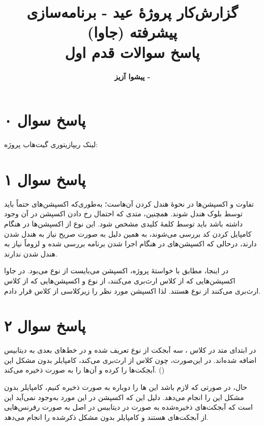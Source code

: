 \documentclass{article}
\title{\textbf{گزارش‌کار پروژۀ عید - برنامه‌سازی پیشرفته (جاوا)}\vspace{1cm}\\پاسخ سوالات قدم اول}
\author{\textbf{پیشوا آزیز - \lr{40313003}}}
\date{}
\begin{document}
\maketitle

\vspace{2cm}

\section*{پاسخ سوال ۰}
لینک ریپازیتوری گیت‌هاب پروژه: 

\section*{پاسخ سوال ۱}
تفاوت  و  اکسپشن‌ها در نحوۀ هندل کردن آن‌هاست؛ به‌طوری‌که اکسپشن‌های  حتماً باید توسط بلوک  هندل شوند. همچنین، متدی که احتمال رخ‌ دادن اکسپشن  در آن وجود داشته باشد باید توسط کلمۀ کلیدی  مشخص شود. این نوع از اکسپشن‌ها در هنگام کامپایل کردن کد بررسی می‌شوند، به همین دلیل به صورت صریح نیاز به هندل شدن دارند، درحالی که اکسپشن‌های  در هنگام اجرا شدن برنامه بررسی شده و لزوماً نیاز به هندل شدن ندارند.

در اینجا، مطابق با خواستۀ پروژه، اکسپشن  می‌بایست از نوع  می‌بود. در جاوا اکسپشن‌هایی که از کلاس  ارث‌بری می‌کنند، از نوع  و اکسپشن‌هایی که از کلاس  ارث‌بری می‌کنند از نوع  هستند. لذا اکسپشن مورد نظر را زیرکلاسی از کلاس  قرار دادم.

\section*{پاسخ سوال ۲}
در ابتدای متد  در کلاس ، سه آبجکت از نوع  تعریف شده و در خط‌های بعدی به دیتابیس اضافه شده‌اند. در این‌صورت، چون کلاس  از  ارث‌بری می‌کند، کامپایلر بدون مشکل این آبجکت‌ها را  کرده و آن‌ها را به صورت  ذخیره می‌کند. ()

حال، در صورتی که لازم باشد این ها را دوباره به صورت  ذخیره کنیم، کامپایلر بدون مشکل این  را انجام می‌دهد. دلیل این که اکسپشن  در این مورد به‌وجود نمی‌آید این است که آبجکت‌های ذخیره‌شده به صورت  در دیتابیس در اصل به صورت رفرنس‌هایی از آبجکت‌های  هستند و کامپایلر بدون مشکل  ذکرشده را انجام می‌دهد.
\end{document}
